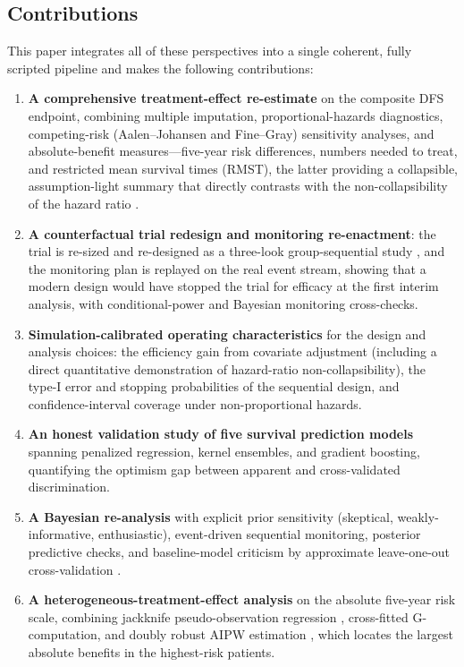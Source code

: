 \subsection*{Contributions}

This paper integrates all of these perspectives into a single coherent,
fully scripted pipeline and makes the following contributions:

\begin{enumerate}[leftmargin=1.7em, itemsep=2pt, topsep=3pt]
  \item \textbf{A comprehensive treatment-effect re-estimate} on the
        composite DFS endpoint, combining multiple imputation,
        proportional-hazards diagnostics, competing-risk (Aalen--Johansen
        and Fine--Gray) sensitivity analyses, and absolute-benefit
        measures---five-year risk differences, numbers needed to treat,
        and restricted mean survival times (RMST), the latter providing a
        collapsible, assumption-light summary that directly contrasts
        with the non-collapsibility of the hazard ratio
        \citep{royston2011,uno2014}.
  \item \textbf{A counterfactual trial redesign and monitoring
        re-enactment}: the trial is re-sized and re-designed as a
        three-look group-sequential study
        \citep{o1979,landemets1983,hwang1990}, and the monitoring plan is
        replayed on the real event stream, showing that a modern design
        would have stopped the trial for efficacy at the first interim
        analysis, with conditional-power and Bayesian monitoring
        cross-checks.
  \item \textbf{Simulation-calibrated operating characteristics} for the
        design and analysis choices: the efficiency gain from covariate
        adjustment (including a direct quantitative demonstration of
        hazard-ratio non-collapsibility), the type-I error and stopping
        probabilities of the sequential design, and confidence-interval
        coverage under non-proportional hazards.
  \item \textbf{An honest validation study of five survival prediction
        models} spanning penalized regression, kernel ensembles, and
        gradient boosting, quantifying the optimism gap between apparent
        and cross-validated discrimination.
  \item \textbf{A Bayesian re-analysis} with explicit prior sensitivity
        (skeptical, weakly-informative, enthusiastic), event-driven
        sequential monitoring, posterior predictive checks, and
        baseline-model criticism by approximate leave-one-out
        cross-validation \citep{vehtari2017}.
  \item \textbf{A heterogeneous-treatment-effect analysis} on the
        absolute five-year risk scale, combining jackknife
        pseudo-observation regression \citep{andersen2003,parner2010},
        cross-fitted G-computation, and doubly robust AIPW estimation
        \citep{hernan2020}, which locates the largest absolute benefits
        in the highest-risk patients.
\end{enumerate}

